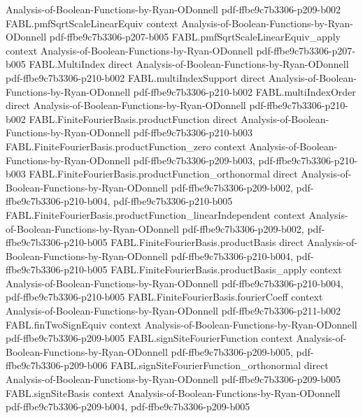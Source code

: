 \begin{theorem}
  {Analysis-of-Boolean-Functions-by-Ryan-ODonnell}
  {pdf-ffbe9c7b3306-p209-b002}
\proofstep
  {FABL.pmfSqrtScaleLinearEquiv}
  {context}
  {Analysis-of-Boolean-Functions-by-Ryan-ODonnell}
  {pdf-ffbe9c7b3306-p207-b005}
\proofstep
  {FABL.pmfSqrtScaleLinearEquiv_apply}
  {context}
  {Analysis-of-Boolean-Functions-by-Ryan-ODonnell}
  {pdf-ffbe9c7b3306-p207-b005}
\proofstep
  {FABL.MultiIndex}
  {direct}
  {Analysis-of-Boolean-Functions-by-Ryan-ODonnell}
  {pdf-ffbe9c7b3306-p210-b002}
\proofstep
  {FABL.multiIndexSupport}
  {direct}
  {Analysis-of-Boolean-Functions-by-Ryan-ODonnell}
  {pdf-ffbe9c7b3306-p210-b002}
\proofstep
  {FABL.multiIndexOrder}
  {direct}
  {Analysis-of-Boolean-Functions-by-Ryan-ODonnell}
  {pdf-ffbe9c7b3306-p210-b002}
\proofstep
  {FABL.FiniteFourierBasis.productFunction}
  {direct}
  {Analysis-of-Boolean-Functions-by-Ryan-ODonnell}
  {pdf-ffbe9c7b3306-p210-b003}
\proofstep
  {FABL.FiniteFourierBasis.productFunction_zero}
  {context}
  {Analysis-of-Boolean-Functions-by-Ryan-ODonnell}
  {pdf-ffbe9c7b3306-p209-b003,
    pdf-ffbe9c7b3306-p210-b003}
\proofstep
  {FABL.FiniteFourierBasis.productFunction_orthonormal}
  {direct}
  {Analysis-of-Boolean-Functions-by-Ryan-ODonnell}
  {pdf-ffbe9c7b3306-p209-b002,
    pdf-ffbe9c7b3306-p210-b004,
    pdf-ffbe9c7b3306-p210-b005}
\proofstep
  {FABL.FiniteFourierBasis.productFunction_linearIndependent}
  {context}
  {Analysis-of-Boolean-Functions-by-Ryan-ODonnell}
  {pdf-ffbe9c7b3306-p209-b002,
    pdf-ffbe9c7b3306-p210-b005}
\proofstep
  {FABL.FiniteFourierBasis.productBasis}
  {direct}
  {Analysis-of-Boolean-Functions-by-Ryan-ODonnell}
  {pdf-ffbe9c7b3306-p210-b004,
    pdf-ffbe9c7b3306-p210-b005}
\proofstep
  {FABL.FiniteFourierBasis.productBasis_apply}
  {context}
  {Analysis-of-Boolean-Functions-by-Ryan-ODonnell}
  {pdf-ffbe9c7b3306-p210-b004,
    pdf-ffbe9c7b3306-p210-b005}
\proofstep
  {FABL.FiniteFourierBasis.fourierCoeff}
  {context}
  {Analysis-of-Boolean-Functions-by-Ryan-ODonnell}
  {pdf-ffbe9c7b3306-p211-b002}
\proofstep
  {FABL.finTwoSignEquiv}
  {context}
  {Analysis-of-Boolean-Functions-by-Ryan-ODonnell}
  {pdf-ffbe9c7b3306-p209-b005}
\proofstep
  {FABL.signSiteFourierFunction}
  {context}
  {Analysis-of-Boolean-Functions-by-Ryan-ODonnell}
  {pdf-ffbe9c7b3306-p209-b005,
    pdf-ffbe9c7b3306-p209-b006}
\proofstep
  {FABL.signSiteFourierFunction_orthonormal}
  {direct}
  {Analysis-of-Boolean-Functions-by-Ryan-ODonnell}
  {pdf-ffbe9c7b3306-p209-b005}
\proofstep
  {FABL.signSiteBasis}
  {context}
  {Analysis-of-Boolean-Functions-by-Ryan-ODonnell}
  {pdf-ffbe9c7b3306-p209-b004,
    pdf-ffbe9c7b3306-p209-b005}

\end{theorem}
